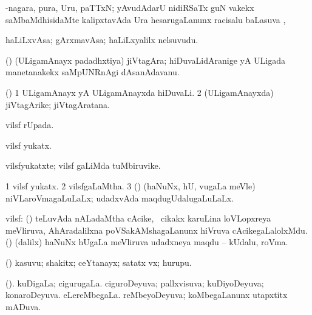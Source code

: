 {{{{{{\bentry
{} 
\gl{\aupa}
\expl{}
\bmng
 -nagara, pura, Uru, paTTxN; yAvudAdarU nidiRSaTx guN \mo vakekx saMbaMdhisidaMte kalipxtavAda Ura hesarugaLanunx racisalu baLasuva \saupa, \udA\  
\emng
\eentry

\bentry
{}
\gl{\nA}
\expl{\It\ }
\bmng
haLiLxvAsa; gArxmavAsa; haLiLxyalilx nelsuvudu. 
\emng
\eentry

\bentry
{} 
\gl{\nA}
\expl{}
\bmng
 (\ca) (ULigamAnayx padadhxtiya) jiVtagAra; hiDuvaLidAranige yA ULigada manetanakekx saMpUNRnAgi dAsanAdavanu. 
\emng
\eentry

\bentry
{} 
\gl{\nA}
\expl{}
\bmng
 (\ca) 
\bnum
\num{1} ULigamAnayx yA ULigamAnayxda hiDuvaLi. 
\num{2} (ULigamAnayxda) jiVtagArike; jiVtagAratana. 
\enum
\emng
\eentry

\bentry
{} 
\gl{\gu}
\expl{}
\bmng
 vilsf rUpada. 
\emng
\eentry

\bentry
{} 
\gl{\gu}
\expl{}
\bmng
 vilsf  yukatx. 
\emng
\eentry

\bentry
{} 
\gl{\nA}
\expl{}
\bmng
 vilsfyukatxte; vilsf  gaLiMda tuMbiruvike. 
\emng
\eentry

\bentry
{} 
\gl{\gu}
\expl{}
\bmng
\bnum
\num{1} vilsf yukatx. 
\num{2} vilsfgaLaMtha. 
\num{3} (\savi) (haNuNx, hU, \mo vugaLa meVle) niVLaroVmagaLuLaLx; udadxvAda maqdugUdalugaLuLaLx. 
\enum
\emng
\eentry

\bentry
{} 
\gl{\nA}
\bmng
 vilsf: 
\banum
{} (\aMrashA) teLuvAda nALadaMtha cAcike, \udA\ cikakx karuLina loVLopxreya meVliruva, AhAradalilxna poVSakAMshagaLanunx hiVruva cAcikegaLalolxMdu. 
 (\savi) (\bava dalilx) haNuNx hUgaLa meVliruva udadxneya maqdu -- kUdalu, roVma. 
\eanum
\emng
\eentry

\bentry
{} 
\gl{\nA}
\expl{}
\bmng
 (\AmA) kasuvu; shakitx; ceYtanayx; satatx vx; hurupu. 
\emng
\eentry

\bentry
{} 
\gl{\gu}
\expl{}
\bmng
\bnum
{}(\savi). 
\banum
{} kuDigaLa; cigurugaLa. 
 ciguroDeyuva; pallxvisuva; kuDiyoDeyuva; konaroDeyuva. 
\eanum
\numie
{} 
\banum
{} eLereMbegaLa. 
 reMbeyoDeyuva; koMbegaLanunx utapxtitx mADuva. 
\eanum
\numie
\enum
\emng
\eentry

}}}}}}
